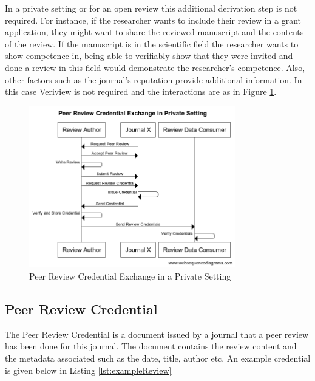 In a private setting or for an open review this additional derivation step is not required. For instance, if the researcher wants to include their review in a grant application, they might want to share the reviewed manuscript and the contents of the review. If the manuscript is in the scientific field the researcher wants to show competence in, being able to verifiably show that they were invited and done a review in this field  would demonstrate the researcher's competence. Also, other factors such as the journal's reputation provide additional information. In this case Veriview is not required and the interactions are as in Figure \ref{fig:sequencePrivate}.

\begin{figure}[htpb]
  \centering
  \includegraphics[width=0.8\textwidth]{figures/sequencePrivate.png}
  \caption{Peer Review Credential Exchange in a Private Setting} \label{fig:sequencePrivate}
\end{figure}

\subsection{Peer Review Credential}

The Peer Review Credential is a document issued by a journal that a peer review has been done for this journal. The document contains the review content and the metadata associated such as the date, title, author etc. An example credential is given below in Listing \ref{lst:exampleReview}



